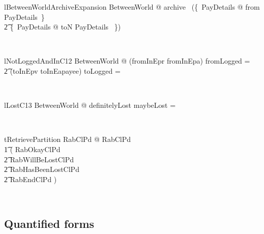\begin{LNewLemma}
\begin{theorem}{lBetweenWorldArchiveExpansion}
    \forall BetweenWorld @ archive \in \power~(\{~PayDetails @ from \mapsto \theta PayDetails~\} \cup \\
      \t2 \{~PayDetails @ toN \mapsto \theta PayDetails ~\})
\end{theorem}~\end{LNewLemma}

\begin{LLemma}
\begin{theorem}{lNotLoggedAndInC12}
    \forall BetweenWorld @ (fromInEpr \cup fromInEpa) \cap fromLogged = \emptyset \land \\
        \t2 (toInEpv \cup toInEapayee) \cap toLogged = \emptyset
\end{theorem}~\end{LLemma}

\begin{LLemma}
\begin{theorem}{lLostC13}
   \forall BetweenWorld @ definitelyLost \cap maybeLost = \emptyset
\end{theorem}~\end{LLemma}


\begin{LThm}
\begin{theorem}{tRetrievePartition}
   \forall RabClPd @ RabClPd \iff
  \\ %
  \t1 ( RabOkayClPd
  \\ %
  \t2 \lor RabWillBeLostClPd
  \\ %
  \t2 \lor RabHasBeenLostClPd
  \\ %
  \t2 \lor RabEndClPd )
\end{theorem}~\end{LThm}

\subsection{Quantified forms}\label{ch10.retrieve-value-mig-quant}

